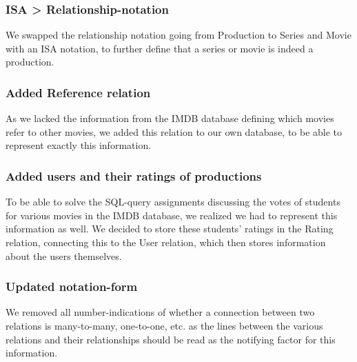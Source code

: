 \subsubsection{ISA > Relationship-notation}
We swapped the relationship notation going from Production to Series and Movie with an ISA notation, to further define that a series or movie is indeed a production.

\subsubsection{Added Reference relation}
As we lacked the information from the IMDB database defining which movies refer to other movies, we added this relation to our own database, to be able to represent exactly this information.

\subsubsection{Added users and their ratings of productions}
To be able to solve the SQL-query assignments discussing the votes of students for various movies in the IMDB database, we realized we had to represent this information as well. We decided to store these students' ratings in the Rating relation, connecting this to the User relation, which then stores information about the users themselves.

\subsubsection{Updated notation-form}
We removed all number-indications of whether a connection between two relations is many-to-many, one-to-one, etc. as the lines between the various relations and their relationships should be read as the notifying factor for this information.